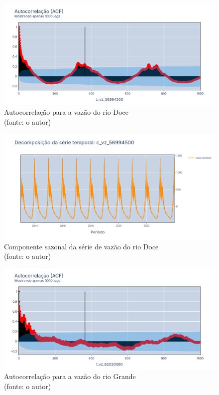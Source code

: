 \begin{figure}[!h]
	\centering
	\includegraphics[scale=0.33]{Figuras/rio_doce/acf_rio_doce.png}
	\caption{Autocorrelação para a vazão do rio Doce\\(fonte: o autor)}
	\label{fig:acf_rio_doce}
\end{figure}

\begin{figure}[!h]
	\centering
	\includegraphics[scale=0.33]{Figuras/rio_doce/sazonalidade_rio_doce.png}
	\caption{Componente sazonal da série de vazão do rio Doce\\(fonte: o autor)}
	\label{fig:sazonalidade_rio_doce}
\end{figure}

\begin{figure}[!h]
	\centering
	\includegraphics[scale=0.33]{Figuras/rio_grande/acf_rio_grande.png}
	\caption{Autocorrelação para a vazão do rio Grande\\(fonte: o autor)}
	\label{fig:acf_rio_grande}
\end{figure}

